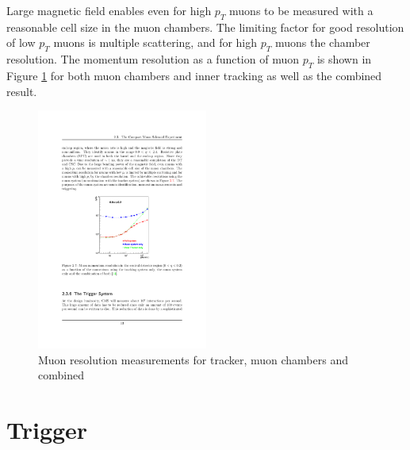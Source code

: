 \par Large magnetic field enables even for high $p_T$ muons to be measured with a reasonable cell size in the muon chambers. The limiting factor for good resolution of low $p_T$ muons is multiple scattering, and for high $p_T$ muons the chamber resolution. The momentum resolution as a function of muon $p_T$ is shown in Figure \ref{fig:MU_pt} for both muon chambers and inner tracking as well as the combined result. 
\begin{figure}[htbp]
	\centering
		\includegraphics[width=0.5\textwidth]{Figures/MU_pt_res.pdf}
	\caption[Muon resolution measurements for tracker, muon chambers and combined]{Muon resolution measurements for tracker, muon chambers and combined \cite{Chatrchyan:2008aa}}
	\label{fig:MU_pt}
\end{figure} 



\section{Trigger}

